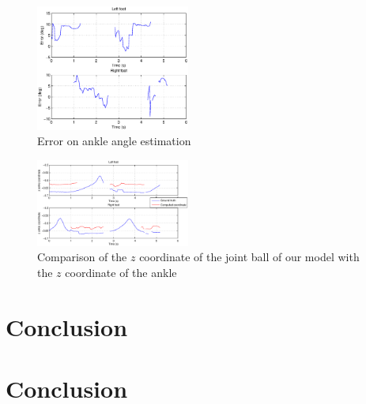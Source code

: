 \documentclass[letterpaper, 10 pt, conference]{ieeeconf}
\begin{document}
\begin{figure}
	\centering
	\includegraphics[width=0.45\textwidth]{images/errorAnkle}
	\caption{Error on ankle angle estimation}
	\label{fig:errorAnkle}
\end{figure}

\begin{figure}
	\centering
	\includegraphics[width=0.45\textwidth]{images/zAnkle}
	\caption{Comparison of the $z$ coordinate of the joint ball of our model with the $z$ coordinate of the ankle}
	\label{fig:zAnkle}
\end{figure}


\section{Conclusion}

\section{Conclusion}

 


\end{document}
